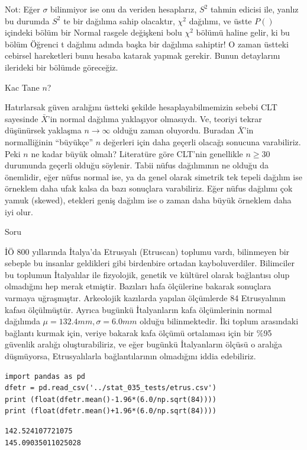 \documentclass[12pt,fleqn]{article}\usepackage{../../common}
\begin{document}
Not: Eğer $\sigma$ bilinmiyor ise onu da veriden hesaplarız, $S^2$ tahmin
edicisi ile, yanlız bu durumda $S^2$ te bir dağılıma sahip olacaktır, $\chi^2$
dağılımı, ve üstte $P()$ içindeki bölüm bir Normal rasgele değişkeni bolu
$\chi^2$ bölümü haline gelir, ki bu bölüm Öğrenci t dağılımı adında başka bir
dağılıma sahiptir! O zaman üstteki cebirsel hareketleri bunu hesaba katarak
yapmak gerekir. Bunun detaylarını ilerideki bir bölümde göreceğiz. 

Kac Tane $n$?

Hatırlarsak güven aralığını üstteki şekilde hesaplayabilmemizin sebebi CLT
sayesinde $\bar{X}$'in normal dağılıma yaklaşıyor olmasıydı. Ve, teoriyi
tekrar düşünürsek yaklaşma $n \to \infty$ olduğu zaman oluyordu. Buradan
$\bar{X}$'in normalliğinin ``büyükçe'' $n$ değerleri için daha geçerli
olacağı sonucuna varabiliriz. Peki $n$ ne kadar büyük olmalı?  Literatüre
göre CLT'nin genellikle $n \ge 30$ durumunda geçerli olduğu söylenir. Tabii
nüfus dağılımının ne olduğu da önemlidir, eğer nüfus normal ise, ya da
genel olarak simetrik tek tepeli dağılım ise örneklem daha ufak kalsa da
bazı sonuçlara varabiliriz. Eğer nüfus dağılımı çok yamuk (skewed),
etekleri geniş dağılım ise o zaman daha büyük örneklem daha iyi olur.

Soru

İÖ 800 yıllarında İtalya'da Etrusyalı (Etruscan) toplumu vardı, bilinmeyen
bir sebeple bu insanlar geldikleri gibi birdenbire ortadan
kayboluverdiler. Bilimciler bu toplumun İtalyalılar ile fizyolojik, genetik
ve kültürel olarak bağlantısı olup olmadığını hep merak etmiştir. Bazıları
hafa ölçülerine bakarak sonuçlara varmaya uğraşmıştır. Arkeolojik kazılarda
yapılan ölçümlerde 84 Etrusyalının kafası ölçülmüştür. Ayrıca bugünkü
İtalyanların kafa ölçümlerinin normal dağılımda $\mu=132.4 mm,\sigma=6.0mm$
olduğu bilinmektedir. İki toplum arasındaki bağlantı kurmak için, veriye
bakarak kafa ölçümü ortalaması için bir \%95 güvenlik aralığı
oluşturabiliriz, ve eğer bugünkü İtalyanların ölçüsü o aralığa düşmüyorsa,
Etrusyalılarla bağlantılarının olmadığını iddia edebiliriz.

\begin{verbatim}
import pandas as pd
dfetr = pd.read_csv('../stat_035_tests/etrus.csv')
print (float(dfetr.mean()-1.96*(6.0/np.sqrt(84))))
print (float(dfetr.mean()+1.96*(6.0/np.sqrt(84))))
\end{verbatim}

\begin{verbatim}
142.524107721075
145.09035011025028
\end{verbatim}
\end{document}
